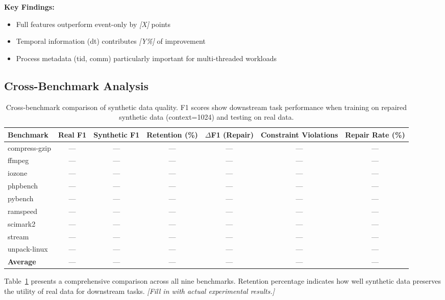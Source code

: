 \textbf{Key Findings:}
\begin{itemize}
    \item Full features outperform event-only by \textit{[X]} points
    \item Temporal information (dt) contributes \textit{[Y\%]} of improvement
    \item Process metadata (tid, comm) particularly important for multi-threaded workloads
\end{itemize}

\subsection{Cross-Benchmark Analysis}
\label{subsec:cross_benchmark}

\begin{table}[t]
\centering
\caption{Cross-benchmark comparison of synthetic data quality. F1 scores show downstream task performance when training on repaired synthetic data (context=1024) and testing on real data.}
\label{tab:cross_benchmark}
\begin{tabular}{@{}lcccccc@{}}
\toprule
\textbf{Benchmark} & \textbf{Real F1} & \textbf{Synthetic F1} & \textbf{Retention (\%)} & \textbf{\(\Delta\)F1 (Repair)} & \textbf{Constraint Violations} & \textbf{Repair Rate (\%)} \\
\midrule
compress-gzip   & --- & --- & --- & --- & --- & --- \\
ffmpeg          & --- & --- & --- & --- & --- & --- \\
iozone          & --- & --- & --- & --- & --- & --- \\
phpbench        & --- & --- & --- & --- & --- & --- \\
pybench         & --- & --- & --- & --- & --- & --- \\
ramspeed        & --- & --- & --- & --- & --- & --- \\
scimark2        & --- & --- & --- & --- & --- & --- \\
stream          & --- & --- & --- & --- & --- & --- \\
unpack-linux    & --- & --- & --- & --- & --- & --- \\
\midrule
\textbf{Average} & --- & --- & --- & --- & --- & --- \\
\bottomrule
\end{tabular}
\end{table}

Table~\ref{tab:cross_benchmark} presents a comprehensive comparison across all nine benchmarks. Retention percentage indicates how well synthetic data preserves the utility of real data for downstream tasks. \textit{[Fill in with actual experimental results.]}

